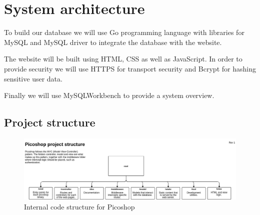 \documentclass{article}
\begin{document}
\section{System architecture}
To build our database we will use Go programming language with libraries for MySQL and MySQL driver to integrate the database with the website. 

The website will be built using HTML, CSS as well as JavaScript. In order to provide security we will use HTTPS for transport security and Bcrypt for hashing sensitive user data.

Finally we will use MySQLWorkbench to provide a system overview.

\subsection{Project structure}
\begin{figure}[H]
    \centering
    \includegraphics[width=17cm]{picoshop-project-structure_rev1.png}
    \caption{Internal code structure for Picoshop}
\end{figure}
\end{document}
